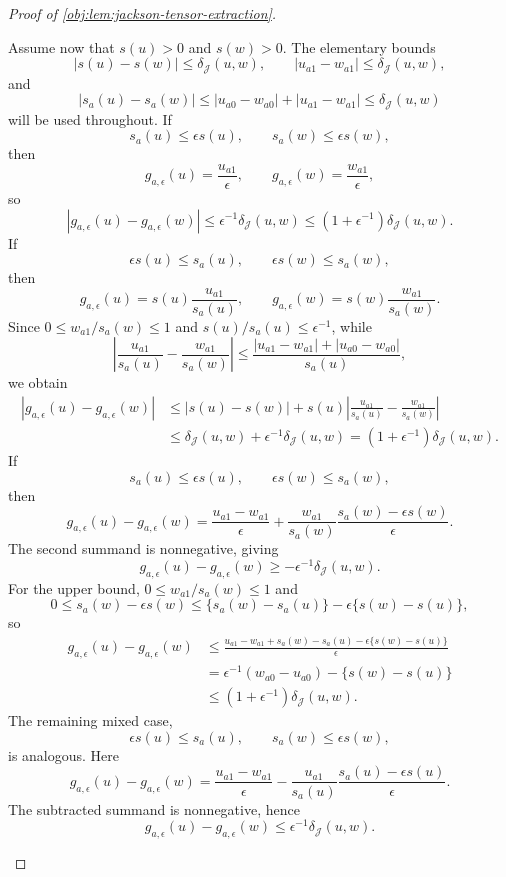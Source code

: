 \documentclass[11pt]{article}
\begin{document}
\begin{proof}[Proof of \cref{obj:lem:jackson-tensor-extraction}]
\begin{enumerate}
Assume now that \(s(u)>0\) and \(s(w)>0\). The elementary bounds
\[
|s(u)-s(w)|\le\delta_{\mathcal J}(u,w),
\qquad
|u_{a1}-w_{a1}|\le\delta_{\mathcal J}(u,w),
\]
and
\[
|s_a(u)-s_a(w)|
\le
|u_{a0}-w_{a0}|+|u_{a1}-w_{a1}|
\le
\delta_{\mathcal J}(u,w)
\]
will be used throughout. If
\[
s_a(u)\le\epsilon s(u),
\qquad
s_a(w)\le\epsilon s(w),
\]
then
\[
g_{a,\epsilon}(u)=\frac{u_{a1}}{\epsilon},
\qquad
g_{a,\epsilon}(w)=\frac{w_{a1}}{\epsilon},
\]
so
\[
|g_{a,\epsilon}(u)-g_{a,\epsilon}(w)|
\le
\epsilon^{-1}\delta_{\mathcal J}(u,w)
\le
(1+\epsilon^{-1})\delta_{\mathcal J}(u,w).
\]
If
\[
\epsilon s(u)\le s_a(u),
\qquad
\epsilon s(w)\le s_a(w),
\]
then
\[
g_{a,\epsilon}(u)=s(u)\frac{u_{a1}}{s_a(u)},
\qquad
g_{a,\epsilon}(w)=s(w)\frac{w_{a1}}{s_a(w)}.
\]
Since \(0\le w_{a1}/s_a(w)\le1\) and \(s(u)/s_a(u)\le\epsilon^{-1}\), while
\[
\left|
\frac{u_{a1}}{s_a(u)}
-
\frac{w_{a1}}{s_a(w)}
\right|
\le
\frac{|u_{a1}-w_{a1}|+|u_{a0}-w_{a0}|}{s_a(u)},
\]
we obtain
\[
\begin{aligned}
|g_{a,\epsilon}(u)-g_{a,\epsilon}(w)|
&\le
|s(u)-s(w)|
+
s(u)
\left|
\frac{u_{a1}}{s_a(u)}
-
\frac{w_{a1}}{s_a(w)}
\right|\\
&\le
\delta_{\mathcal J}(u,w)
+
\epsilon^{-1}\delta_{\mathcal J}(u,w)
=
(1+\epsilon^{-1})\delta_{\mathcal J}(u,w).
\end{aligned}
\]
If
\[
s_a(u)\le\epsilon s(u),
\qquad
\epsilon s(w)\le s_a(w),
\]
then
\[
g_{a,\epsilon}(u)-g_{a,\epsilon}(w)
=
\frac{u_{a1}-w_{a1}}{\epsilon}
+
\frac{w_{a1}}{s_a(w)}
\frac{s_a(w)-\epsilon s(w)}{\epsilon}.
\]
The second summand is nonnegative, giving
\[
g_{a,\epsilon}(u)-g_{a,\epsilon}(w)
\ge
-\epsilon^{-1}\delta_{\mathcal J}(u,w).
\]
For the upper bound, \(0\le w_{a1}/s_a(w)\le1\) and
\[
0\le s_a(w)-\epsilon s(w)
\le
\{s_a(w)-s_a(u)\}-\epsilon\{s(w)-s(u)\},
\]
so
\[
\begin{aligned}
g_{a,\epsilon}(u)-g_{a,\epsilon}(w)
&\le
\frac{u_{a1}-w_{a1}+s_a(w)-s_a(u)-\epsilon\{s(w)-s(u)\}}{\epsilon}\\
&=
\epsilon^{-1}(w_{a0}-u_{a0})-\{s(w)-s(u)\}\\
&\le
(1+\epsilon^{-1})\delta_{\mathcal J}(u,w).
\end{aligned}
\]
The remaining mixed case,
\[
\epsilon s(u)\le s_a(u),
\qquad
s_a(w)\le\epsilon s(w),
\]
is analogous. Here
\[
g_{a,\epsilon}(u)-g_{a,\epsilon}(w)
=
\frac{u_{a1}-w_{a1}}{\epsilon}
-
\frac{u_{a1}}{s_a(u)}
\frac{s_a(u)-\epsilon s(u)}{\epsilon}.
\]
The subtracted summand is nonnegative, hence
\[
g_{a,\epsilon}(u)-g_{a,\epsilon}(w)
\le
\epsilon^{-1}\delta_{\mathcal J}(u,w).
\]

\end{enumerate}
\end{proof}
\end{document}
